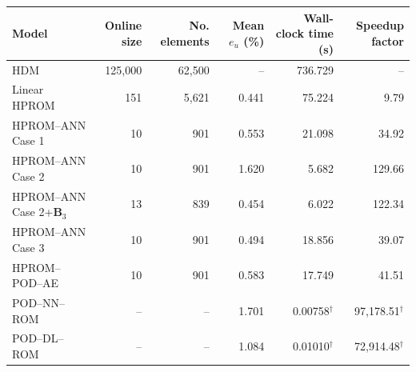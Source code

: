 \begin{tabular}{lrr|rrr}
\toprule
Model & Online size & No. elements & Mean $e_u$ (\%) & Wall-clock time (s) & Speedup factor \\
\midrule
HDM & 125{,}000 & 62{,}500 & -- & 736.729 & -- \\
\midrule
Linear HPROM & 151 & 5{,}621 & 0.441 & 75.224 & 9.79 \\
HPROM--ANN Case 1 & 10 & 901 & 0.553 & 21.098 & 34.92 \\
HPROM--ANN Case 2 & 10 & 901 & 1.620 & 5.682 & 129.66 \\
HPROM--ANN Case 2+$\mathbf B_3$ & 13 & 839 & 0.454 & 6.022 & 122.34 \\
HPROM--ANN Case 3 & 10 & 901 & 0.494 & 18.856 & 39.07 \\
HPROM--POD--AE & 10 & 901 & 0.583 & 17.749 & 41.51 \\
\midrule
POD--NN--ROM & -- & -- & 1.701 & 0.00758$^\dagger$ & 97{,}178.51$^\dagger$ \\
POD--DL--ROM & -- & -- & 1.084 & 0.01010$^\dagger$ & 72{,}914.48$^\dagger$ \\
\bottomrule
\end{tabular}
